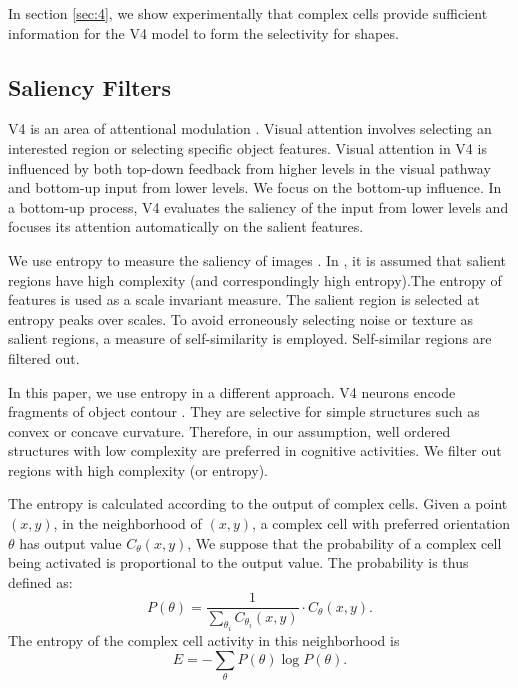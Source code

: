 \documentclass[conference]{IEEEtran}
\begin{document}
In section \ref{sec:4},
we show experimentally that complex cells provide sufficient information 
for the V4 model to form the selectivity for shapes.

\subsection{Saliency Filters}

V4 is an area of attentional modulation \cite{roe2012}.
Visual attention involves selecting an interested region or selecting specific object features.
Visual attention in V4 is influenced by both top-down feedback from higher levels in the visual pathway
and bottom-up input from lower levels.
We focus on the bottom-up influence.
In a bottom-up process, V4 evaluates the saliency of the input from lower levels
and focuses its attention automatically on the salient features.

We use entropy to measure the saliency of images \cite{kadir2001}.
In \cite{kadir2001}, it is assumed that salient regions have high complexity (and correspondingly high entropy).The entropy of features is used as a scale invariant measure.
The salient region is selected at entropy peaks over scales.
To avoid erroneously selecting noise or texture as salient regions,
a measure of self-similarity is employed.
Self-similar regions are filtered out.

In this paper, we use entropy in a different approach.
V4 neurons encode fragments of object contour \cite{pasupathy2001,pasupathy2002}.
They are selective for simple structures such as convex or concave curvature.
Therefore, in our assumption, 
well ordered structures with low complexity are preferred in cognitive activities.
We filter out regions with high complexity (or entropy).

The entropy is calculated according to the output of complex cells.
Given a point $(x,y)$, in the neighborhood of $(x,y)$,
a complex cell with preferred orientation $\theta$ has output value $C_{\theta}(x,y)$,
We suppose that the probability of a complex cell being activated
is proportional to the output value.
The probability is thus defined as:
\begin{equation}
P(\theta)=\frac{1}{\sum_{\theta_i} C_{\theta_i}(x,y)}\cdot C_{\theta}(x,y).
\end{equation}
The entropy of the complex cell activity in this neighborhood
is 
\begin{equation}
E=-\sum_{\theta} P(\theta) \log P(\theta).
\end{equation}
\end{document}
